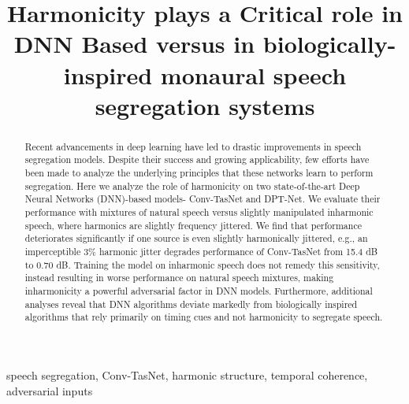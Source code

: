\documentclass{article}
\title{Harmonicity plays a Critical role in DNN Based versus in biologically-inspired monaural speech segregation systems}
\begin{document}
\maketitle
\begin{abstract}
Recent advancements in deep learning have led to drastic improvements in speech segregation models. Despite their success and growing applicability, few efforts have been made to analyze the underlying principles that these networks learn to perform segregation. Here we analyze the role of harmonicity on two state-of-the-art Deep Neural Networks (DNN)-based models- Conv-TasNet and DPT-Net\cite{luo2019conv, chen2020dual}. We evaluate their performance with mixtures of natural speech versus slightly manipulated inharmonic speech, where harmonics are slightly frequency jittered. We find that performance deteriorates significantly if one source is even slightly harmonically jittered, e.g., an imperceptible $3\%$ harmonic jitter degrades performance of Conv-TasNet from 15.4 dB to 0.70 dB.
Training the model on inharmonic speech does not remedy this sensitivity, instead resulting in worse performance on natural speech mixtures, making inharmonicity a powerful adversarial factor in DNN models. Furthermore, additional analyses reveal that DNN algorithms deviate markedly from biologically inspired algorithms\cite{krishnan2014segregating} that rely primarily on timing cues and not harmonicity to segregate speech.


\end{abstract}
\begin{keywords}
speech segregation, Conv-TasNet, harmonic structure, temporal coherence, adversarial inputs
\end{keywords}
\end{document}
